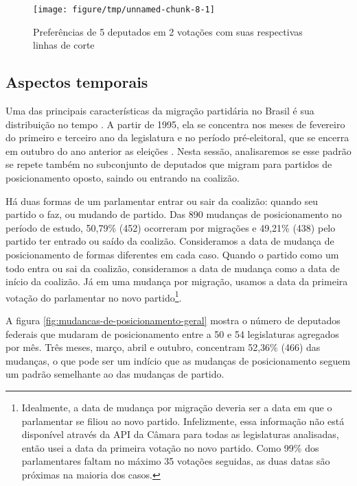 \documentclass[a4paper,titlepage]{ppgi}\usepackage[]{graphicx}\usepackage[]{color}
\newenvironment{knitrout}{}{} %
\begin{document}
\begin{knitrout}
\color{fgcolor}\begin{figure}
\texttt{[image: figure/tmp/unnamed-chunk-8-1]} \caption[Preferências de 5 deputados em 2 votações com suas respectivas linhas de corte]{Preferências de 5 deputados em 2 votações com suas respectivas linhas de corte}\label{fig:unnamed-chunk-8}
\end{figure}


\end{knitrout}

\subsection{Aspectos temporais}



Uma das principais características da migração partidária no Brasil é sua
distribuição no tempo \cite{Araujo2000,Melo2004,Freitas2008}. A partir de 1995,
ela se concentra nos meses de fevereiro do primeiro e terceiro ano da
legislatura e no período pré-eleitoral, que se encerra em outubro do ano
anterior as eleições \cite{Freitas2008,Lei9504/1997}. Nesta sessão,
analisaremos se esse padrão se repete também no subconjunto de deputados que
migram para partidos de posicionamento oposto, saindo ou entrando na coalizão.

Há duas formas de um parlamentar entrar ou sair da coalizão: quando seu partido
o faz, ou mudando de partido. Das 890 mudanças de
posicionamento no período de estudo,
50,79\% (452)
ocorreram por migrações e
49,21\% (438)
pelo partido ter entrado ou saído da coalizão. Consideramos a data de mudança
de posicionamento de formas diferentes em cada caso. Quando o partido como um
todo entra ou sai da coalizão, consideramos a data de mudança como a data de
início da coalizão. Já em uma mudança por migração, usamos a data da primeira
votação do parlamentar no novo partido\footnote{Idealmente, a data de mudança
por migração deveria ser a data em que o parlamentar se filiou ao novo partido.
Infelizmente, essa informação não está disponível através da \gls{API} da
Câmara para todas as legislaturas analisadas, então usei a data da primeira
votação no novo partido. Como 99\% dos parlamentares faltam no máximo 35
votações seguidas, as duas datas são próximas na maioria dos casos.}.

A figura \ref{fig:mudancas-de-posicionamento-geral} mostra o número de
deputados federais que mudaram de posicionamento entre a 50\textordfeminine{} e
54\textordfeminine{} legislaturas agregados por mês. Três meses, março, abril e
outubro, concentram
52,36\%
(466) das mudanças, o que pode
ser um indício que as mudanças de posicionamento seguem um padrão semelhante ao
das mudanças de partido.
\end{document}
